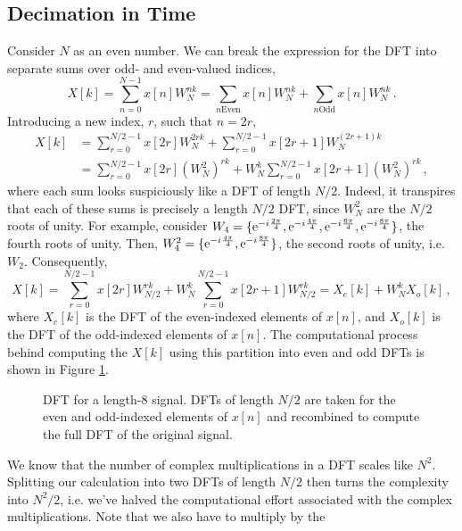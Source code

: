 \subsection{Decimation in Time}
%
Consider $N$ as an even number. We can break the expression for the DFT
into separate sums over odd- and even-valued indices,
%
\begin{displaymath}
  X[k] = \sum_{n=0}^{N-1}x[n]W_N^{nk}
  = \sum_{n \mathrm{Even}}x[n] W_N^{nk}
  + \sum_{n \mathrm{Odd}}x[n] W_N^{nk} \,.
\end{displaymath}
%
Introducing a new index, $r$, such that $n=2r$,
%
\begin{align*}
  X[k] &= \sum_{r=0}^{N/2-1} x[2r] W_N^{2rk}
  + \sum_{r=0}^{N/2-1} x[2r+1] W_N^{(2r+1)k} \\
  &= \sum_{r=0}^{N/2-1}x[2r]\left(W_N^2\right)^{rk}
  + W_N^k\sum_{r=0}^{N/2-1}x[2r+1]\left(W_N^2\right)^{rk} \,,
\end{align*}
%
where each sum looks suspiciously like a DFT of length $N/2$. Indeed,
it transpires that each of these sums is precisely a length $N/2$ DFT,
since $W_N^2$ are the $N/2$ roots of unity. For example, consider
$W_4 = \{ \mathrm{e}^{-{i\mkern1mu}\frac{2\pi}{4}}, \mathrm{e}^{-{i\mkern1mu}\frac{4\pi}{4}}, \mathrm{e}^{-{i\mkern1mu}\frac{6\pi}{4}}, \mathrm{e}^{-{i\mkern1mu}\frac{8\pi}{4}} \}$,
the fourth roots of unity. Then,
$W_4^2 = \{ \mathrm{e}^{-{i\mkern1mu}\frac{4\pi}{4}}, \mathrm{e}^{-{i\mkern1mu}\frac{8\pi}{4}} \}$, the
second roots of unity, i.e. $W_2$. Consequently,
%
\begin{displaymath}
  X[k] = 
  \sum_{r=0}^{N/2-1}x[2r] W_{N/2}^{rk}
  + W_N^k\sum_{r=0}^{N/2-1}x[2r+1] W_{N/2}^{rk}
  = X_e[k] + W_N^k X_o[k] \,,
\end{displaymath}
%
where $X_e[k]$ is the DFT of the even-indexed elements of $x[n]$,
and $X_o[k]$ is the DFT of the odd-indexed elements of $x[n]$. The
computational process behind computing the $X[k]$ using this partition
into even and odd DFTs is shown in Figure \ref{fig::lecture_11_dft_one}.
%
\begin{figure}[H]
  
  \caption{DFT for a length-8 signal. DFTs of length $N/2$ are taken for the
    even and odd-indexed elements of $x[n]$ and recombined to compute the full
    DFT of the original signal.
  }
  \label{fig::lecture_11_dft_one}
\end{figure}
%
We know that the number of complex multiplications in a DFT scales like $N^2$.
Splitting our calculation into two DFTs of length $N/2$ then turns the
complexity into $N^2 / 2$, i.e. we've halved the computational effort associated
with the complex multiplications. Note that we also have to multiply by the
